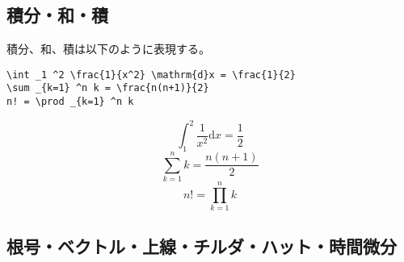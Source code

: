 \subsection{積分・和・積}
\label{sec:latex:integration}

積分、和、積は以下のように表現する。
\begin{reidai}
\begin{verbatim}
\int _1 ^2 \frac{1}{x^2} \mathrm{d}x = \frac{1}{2}
\sum _{k=1} ^n k = \frac{n(n+1)}{2}
n! = \prod _{k=1} ^n k
\end{verbatim}
\end{reidai}
\vspace*{-1.5em}
\begin{kekka}
  \begin{equation*}
    \int _1 ^2 \frac{1}{x^2} \mathrm{d}x = \frac{1}{2}
  \end{equation*}
  \begin{equation*}
    \sum _{k=1} ^n k = \frac{n(n+1)}{2}
  \end{equation*}
  \begin{equation*}
    n! = \prod _{k=1} ^n k
  \end{equation*}
\end{kekka}

\subsection{根号・ベクトル・上線・チルダ・ハット・時間微分}
\label{sec:latex:root}

